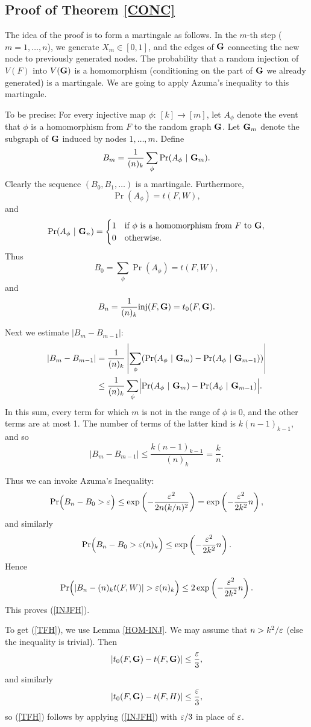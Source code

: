 \documentclass[fleqn]{article}
\begin{document}
\subsection{Proof of Theorem \ref{CONC}}

The idea of the proof is to form a martingale as follows. In the
$m$-th step ($m=1,\dots,n$), we generate $X_m\in[0,1]$, and the edges
of ${\mathbf G}$ connecting the new node to previously generated nodes. The
probability that a random injection of $V(F)$ into $V({\mathbf G})$ is a
homomorphism (conditioning on the part of ${\mathbf G}$ we already generated)
is a martingale. We are going to apply Azuma's inequality to this
martingale.

To be precise: For every injective map $\phi:~[k]\to[m]$, let
$A_\phi$ denote the event that $\phi$ is a homomorphism from $F$ to
the random graph ${\mathbf G}$. Let ${\mathbf G}_m$ denote the subgraph of ${\mathbf G}$
induced by nodes $1,\dots,m$. Define
\[
B_m=\frac{1}{(n)_k}\sum_{\phi} \Pr(A_\phi~|~{\mathbf G}_m).
\]
Clearly the sequence $(B_0,B_1,\dots)$ is a martingale. Furthermore,
\[
\Pr(A_\phi)=t(F,W),
\]
and
\[
\Pr(A_\phi~|~{\mathbf G}_n)=
  \begin{cases}
    1 & \text{if $\phi$ is a homomorphism from $F$ to ${\mathbf G}$}, \\
    0 & \text{otherwise}.
  \end{cases}
\]
Thus
\[
B_0=\sum_\phi \Pr(A_\phi)=t(F,W),
\]
and
\[
B_n=\frac{1}{(n)_k}{\rm inj}(F,{\mathbf G})=t_0(F,{\mathbf G}).
\]

Next we estimate $|B_m-B_{m-1}|$:
\begin{align*}
|B_m-B_{m-1}| &=\frac{1}{(n)_k} \left|\sum_{\phi}
(\Pr(A_\phi~|~{\mathbf G}_m)-\Pr(A_\phi~|~{\mathbf G}_{m-1}))\right|\\
&\le \frac{1}{(n)_k}\sum_{\phi}
\Bigl|\Pr(A_\phi~|~{\mathbf G}_m)-\Pr(A_\phi~|~{\mathbf G}_{m-1})\Bigr|.
\end{align*}
In this sum, every term for which $m$ is not in the range of $\phi$
is 0, and the other terms are at most 1. The number of terms of the
latter kind is $k(n-1)_{k-1}$, and so
\[
|B_m-B_{m-1}| \le \frac{k(n-1)_{k-1}}{(n)_k}=\frac{k}{n}.
\]

Thus we can invoke Azuma's Inequality:
\[
\Pr\Bigl(B_n-B_0>\varepsilon\Bigr) \le
\exp\left(-\frac{\varepsilon^2}{2n(k/n)^2}\right)=
\exp\left(-\frac{\varepsilon^2}{2k^2}n\right),
\]
and similarly
\[
\Pr\Bigl(B_n-B_0>\varepsilon(n)_k\Bigr) \le
\exp\left(-\frac{\varepsilon^2}{2k^2}n\right).
\]
Hence
\[
\Pr\Bigl(|B_n-(n)_kt(F,W)|>\eps(n)_k\Bigr) \le
2\exp\left(-\frac{\eps^2}{2k^2}n\right).
\]
This proves (\ref{INJFH}).

To get (\ref{TFH}), we use Lemma \ref{HOM-INJ}. We may assume that
$n>k^2/\varepsilon$ (else the inequality is trivial). Then
\[
|t_0(F,{\mathbf G})-t(F,{\mathbf G})|\le \frac{\varepsilon}{3},
\]
and similarly
\[
|t_0(F,{\mathbf G})-t(F,H)|\le \frac{\varepsilon}{3},
\]
so (\ref{TFH}) follows by applying (\ref{INJFH}) with $\varepsilon/3$ in
place of $\varepsilon$.
\end{document}
